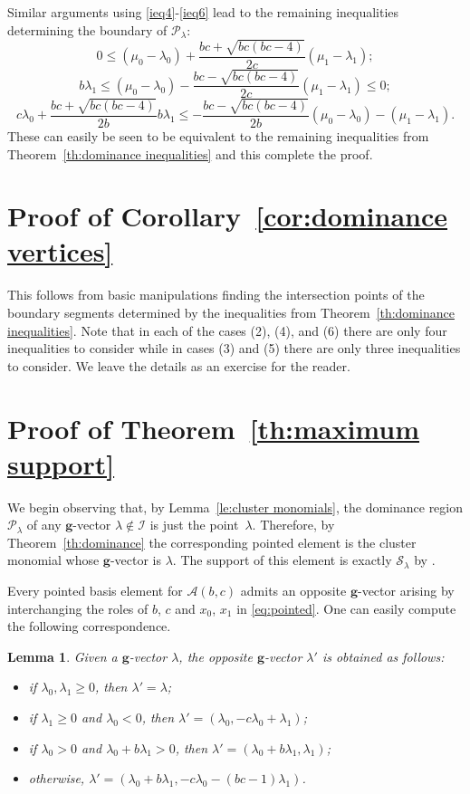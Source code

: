 \documentclass[pdflatex,sn-mathphys]{sn-jnl}%
\theoremstyle{thmstyleone}%
\newtheorem{lemma}[theorem]{Lemma}
\theoremstyle{thmstyletwo}%
\theoremstyle{thmstylethree}%
\newcommand{\bfg}{\boldsymbol{g}}
\newcommand{\cA}{\mathcal{A}}
\newcommand{\cI}{\mathcal{I}}
\newcommand{\cP}{\mathcal{P}}
\newcommand{\cS}{\mathcal{S}}
\begin{document}
  Similar arguments using \eqref{ieq4}-\eqref{ieq6} lead to the remaining inequalities determining the boundary of $\cP_\lambda$:
  \[ 0 \le (\mu_0-\lambda_0)+\frac{bc+\sqrt{bc(bc-4)}}{2c}(\mu_1-\lambda_1);\]
  \[ b\lambda_1 \le (\mu_0-\lambda_0)-\frac{bc-\sqrt{bc(bc-4)}}{2c}(\mu_1-\lambda_1) \le 0;\]
  \[ c\lambda_0+\frac{bc+\sqrt{bc(bc-4)}}{2b}b\lambda_1 \le -\frac{bc-\sqrt{bc(bc-4)}}{2b}(\mu_0-\lambda_0)-(\mu_1-\lambda_1).\]
  These can easily be seen to be equivalent to the remaining inequalities from Theorem~\ref{th:dominance inequalities} and this complete the proof.


\section{Proof of Corollary~\ref{cor:dominance vertices}}
\label{sec:dominance vertices}

  This follows from basic manipulations finding the intersection points of the boundary segments determined by the inequalities from Theorem~\ref{th:dominance inequalities}.
  Note that in each of the cases (2), (4), and (6) there are only four inequalities to consider while in cases (3) and (5) there are only three inequalities to consider.
  We leave the details as an exercise for the reader.


\section{Proof of Theorem~\ref{th:maximum support}}
\label{sec:maximum support} 
  
  We begin observing that, by Lemma~\ref{le:cluster monomials}, the dominance region $\cP_\lambda$ of any $\bfg$-vector $\lambda\not\in\cI$ is just the point~$\lambda$.
  Therefore, by Theorem~\ref{th:dominance} the corresponding pointed element is the cluster monomial whose $\bfg$-vector is $\lambda$. 
  The support of this element is exactly $\cS_\lambda$ by \cite[Proposition 4.1]{LLZ14}.
  
  Every pointed basis element for $\cA(b,c)$ admits an opposite $\bfg$-vector arising by interchanging the roles of $b$, $c$ and $x_0$, $x_1$ in \eqref{eq:pointed}. 
  One can easily compute the following correspondence.
  \begin{lemma}
    Given a $\bfg$-vector $\lambda$, the opposite $\bfg$-vector $\lambda'$ is obtained as follows:
    \begin{itemize}
      \item if $\lambda_0,\lambda_1\ge0$, then $\lambda'=\lambda$;
      \item if $\lambda_1\ge0$ and $\lambda_0<0$, then $\lambda'=(\lambda_0,-c\lambda_0+\lambda_1)$;
      \item if $\lambda_0>0$ and $\lambda_0+b\lambda_1>0$, then $\lambda'=(\lambda_0+b\lambda_1,\lambda_1)$;
      \item otherwise, $\lambda'=(\lambda_0+b\lambda_1,-c\lambda_0-(bc-1)\lambda_1)$.
    \end{itemize}
  \end{lemma}
\end{document}
